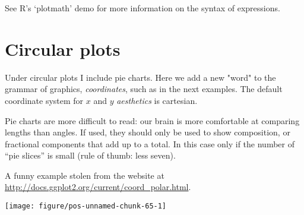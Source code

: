 \documentclass[paper=a4,headsepline,BCOR=12mm,twoside,open=right,%
titlepage,headings=small,fontsize=10pt,index=totoc,bibliography=totoc,%
captions=tableheading,captions=nooneline]{scrbook}\usepackage{knitr}
\begin{document}
See R's `plotmath' demo for more information on the syntax of expressions.

\section{Circular plots}

Under circular plots I include pie charts. Here we add a new "word" to the grammar of graphics, \textit{coordinates}, such as  in the next examples. The default coordinate system for $x$ and $y$ \textit{aesthetics} is cartesian.

Pie charts are more difficult to read: our brain is more comfortable at comparing
lengths than angles. If used, they should only be used to show composition, or
fractional components that add up to a total. In this case only if the number of
“pie slices” is small (rule of thumb: less seven).

A funny example stolen from the \ggplot website at \url{http://docs.ggplot2.org/current/coord_polar.html}.

\begin{knitrout}\footnotesize
{}\color{fgcolor}\begin{kframe}
\begin{alltt}
 \hlkwb{<-} \hlstd{(}
   \hlstd{=} \hlstd{(}\hlstd{,} \hlstd{),}
   \hlstd{=} \hlstd{(}\hlstd{,} \hlstd{)}
\hlstd{)}
 \hlstd{(} \hlstd{=} \hlstd{,}     \hlopt{+}
  \hlstd{(} \hlstd{=} \hlstd{,}  \hlstd{=} \hlstd{)} \hlopt{+}
  \hlstd{(} \hlstd{=} \hlstd{(}\hlstd{,} \hlstd{))} \hlopt{+}
  \hlstd{(}\hlstd{,}   \hlopt{/} \hlstd{)} \hlopt{+}
  \hlstd{(} \hlstd{=} \hlstd{)}
\end{alltt}
\end{kframe}

{\centering \texttt{[image: figure/pos-unnamed-chunk-65-1]} 

}



\end{knitrout}
\end{document}
